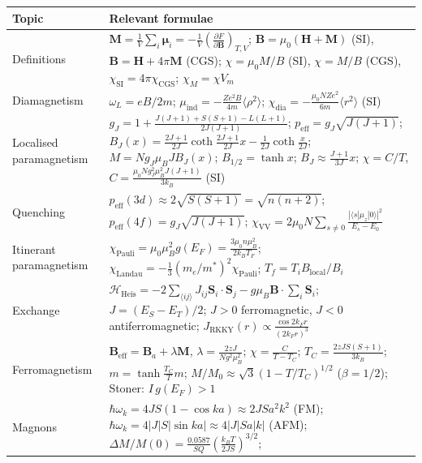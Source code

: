 \documentclass[11pt,a4paper]{article}
\newcommand{\vb}[1]{\mathbf{#1}}
\begin{document}
\begin{table}[htbp]
\centering
\small
\renewcommand{\arraystretch}{1.15}
\begin{tabularx}{\textwidth}{L{3.1cm} Y}
\toprule
\textbf{Topic} & \textbf{Relevant formulae} \\
\midrule
Definitions &
$\vb{M} = \frac{1}{V}\sum_i\boldsymbol{\mu}_i = -\frac{1}{V}\left(\frac{\partial F}{\partial\vb{B}}\right)_{T,V}$;
$\vb{B} = \mu_0(\vb{H}+\vb{M})$ (SI), $\vb{B} = \vb{H}+4\pi\vb{M}$ (CGS);
$\chi = \mu_0M/B$ (SI), $\chi = M/B$ (CGS), $\chi_{\mathrm{SI}} = 4\pi\chi_{\mathrm{CGS}}$; $\chi_M = \chi V_m$ \\
\addlinespace
Diamagnetism &
$\omega_L = eB/2m$; $\mu_{\mathrm{ind}} = -\frac{Ze^2B}{4m}\langle\rho^2\rangle$;
$\chi_{\mathrm{dia}} = -\frac{\mu_0NZe^2}{6m}\langle r^2\rangle$ (SI) \\
\addlinespace
Localised paramagnetism &
$g_J = 1+\frac{J(J+1)+S(S+1)-L(L+1)}{2J(J+1)}$; $p_{\mathrm{eff}} = g_J\sqrt{J(J+1)}$;
$B_J(x) = \frac{2J+1}{2J}\coth\frac{2J+1}{2J}x - \frac{1}{2J}\coth\frac{x}{2J}$;
$M = Ng_J\mu_BJB_J(x)$;
$B_{1/2} = \tanh x$; $B_J \approx \frac{J+1}{3J}x$;
$\chi = C/T$, $C = \frac{\mu_0Ng_J^2\mu_B^2J(J+1)}{3k_B}$ (SI) \\
\addlinespace
Quenching &
$p_{\mathrm{eff}}(3d)\approx 2\sqrt{S(S+1)} = \sqrt{n(n+2)}$;
$p_{\mathrm{eff}}(4f) = g_J\sqrt{J(J+1)}$;
$\chi_{\mathrm{VV}} = 2\mu_0N\sum_{s\neq0}\frac{|\langle s|\mu_z|0\rangle|^2}{E_s-E_0}$ \\
\addlinespace
Itinerant paramagnetism &
$\chi_{\mathrm{Pauli}} = \mu_0\mu_B^2g(E_F) = \frac{3\mu_0n\mu_B^2}{2k_BT_F}$;
$\chi_{\mathrm{Landau}} = -\frac{1}{3}(m_e/m^*)^2\chi_{\mathrm{Pauli}}$;
$T_f = T_iB_{\mathrm{local}}/B_i$ \\
\addlinespace
Exchange &
$\mathcal{H}_{\mathrm{Heis}} = -2\sum_{\langle ij\rangle}J_{ij}\vb{S}_i\cdot\vb{S}_j - g\mu_B\vb{B}\cdot\sum_i\vb{S}_i$;
$J = (E_S-E_T)/2$; $J>0$ ferromagnetic, $J<0$ antiferromagnetic;
$J_{\mathrm{RKKY}}(r)\propto\frac{\cos 2k_Fr}{(2k_Fr)^3}$ \\
\addlinespace
Ferromagnetism &
$\vb{B}_{\mathrm{eff}} = \vb{B}_a + \lambda\vb{M}$, $\lambda = \frac{2zJ}{Ng^2\mu_B^2}$;
$\chi = \frac{C}{T-T_C}$; $T_C = \frac{2zJS(S+1)}{3k_B}$;
$m = \tanh\frac{T_C}{T}m$; $M/M_0 \approx \sqrt{3}(1-T/T_C)^{1/2}$ ($\beta = 1/2$);
Stoner: $I\,g(E_F)>1$ \\
\addlinespace
Magnons &
$\hbar\omega_k = 4JS(1-\cos ka)\approx 2JSa^2k^2$ (FM);
$\hbar\omega_k = 4|J|S|\sin ka| \approx 4|J|Sa|k|$ (AFM);
$\Delta M/M(0) = \frac{0.0587}{SQ}\left(\frac{k_BT}{2JS}\right)^{3/2}$;

\end{tabularx}
\end{table}
\end{document}
